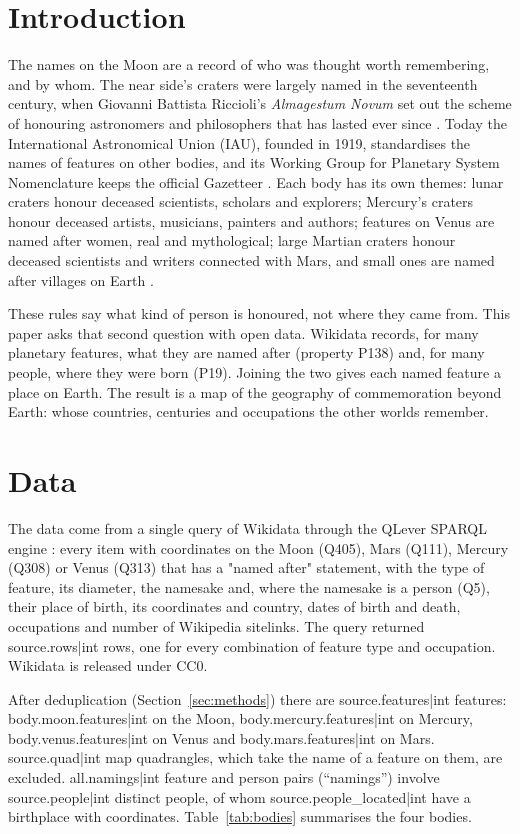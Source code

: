 \documentclass[11pt,a4paper]{article}
\begin{document}
\section{Introduction}
The names on the Moon are a record of who was thought worth remembering, and by whom. The near side's craters were largely named in the seventeenth century, when Giovanni Battista Riccioli's \textit{Almagestum Novum} \citep{riccioli} set out the scheme of honouring astronomers and philosophers that has lasted ever since \citep{whitaker}. Today the International Astronomical Union (IAU), founded in 1919, standardises the names of features on other bodies, and its Working Group for Planetary System Nomenclature keeps the official Gazetteer \citep{gazetteer}. Each body has its own themes: lunar craters honour deceased scientists, scholars and explorers; Mercury's craters honour deceased artists, musicians, painters and authors; features on Venus are named after women, real and mythological; large Martian craters honour deceased scientists and writers connected with Mars, and small ones are named after villages on Earth \citep{gazetteer}.

These rules say what kind of person is honoured, not where they came from. This paper asks that second question with open data. Wikidata \citep{wikidata} records, for many planetary features, what they are named after (property P138) and, for many people, where they were born (P19). Joining the two gives each named feature a place on Earth. The result is a map of the geography of commemoration beyond Earth: whose countries, centuries and occupations the other worlds remember.

\section{Data}
The data come from a single query of Wikidata through the QLever SPARQL engine \citep{qlever}: every item with coordinates on the Moon (Q405), Mars (Q111), Mercury (Q308) or Venus (Q313) that has a "named after" statement, with the type of feature, its diameter, the namesake and, where the namesake is a person (Q5), their place of birth, its coordinates and country, dates of birth and death, occupations and number of Wikipedia sitelinks. The query returned {{source.rows|int}} rows, one for every combination of feature type and occupation. Wikidata is released under CC0.

After deduplication (Section~\ref{sec:methods}) there are {{source.features|int}} features: {{body.moon.features|int}} on the Moon, {{body.mercury.features|int}} on Mercury, {{body.venus.features|int}} on Venus and {{body.mars.features|int}} on Mars. {{source.quad|int}} map quadrangles, which take the name of a feature on them, are excluded. {{all.namings|int}} feature and person pairs (``namings'') involve {{source.people|int}} distinct people, of whom {{source.people_located|int}} have a birthplace with coordinates. Table~\ref{tab:bodies} summarises the four bodies.
\end{document}
